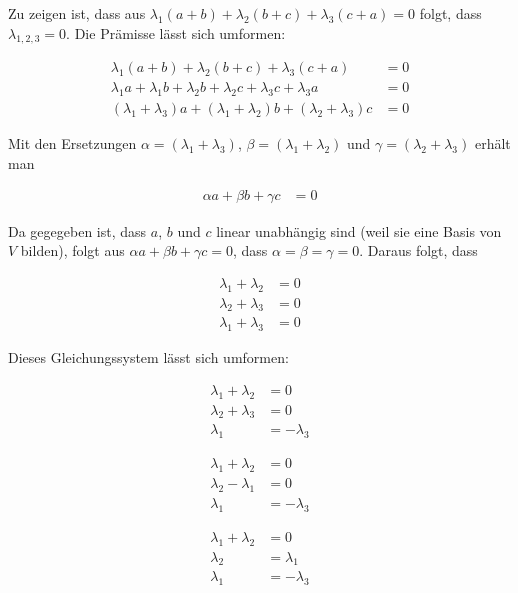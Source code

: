 \documentclass[a4paper,german,12pt,smallheadings]{scrartcl}
\begin{document}
Zu zeigen ist, dass aus $\lambda_1 (a+b) + \lambda_2 (b+c) + \lambda_3 (c+a) =
0$ folgt, dass $\lambda_{1,2,3} = 0$. Die Prämisse lässt sich umformen:

\begin{align*}
  \lambda_1 (a+b) + \lambda_2 (b+c) + \lambda_3 (c+a) &= 0 \\
  \lambda_1 a + \lambda_1 b + \lambda_2 b + \lambda_2 c + \lambda_3 c + \lambda_3 a &= 0 \\
  (\lambda_1 + \lambda_3) a + (\lambda_1 + \lambda_2) b + (\lambda_2 + \lambda_3) c &= 0
\end{align*}

Mit den Ersetzungen $\alpha = (\lambda_1 + \lambda_3)$, $\beta = (\lambda_1 +
\lambda_2)$ und $\gamma = (\lambda_2 + \lambda_3)$ erhält man

\begin{align*}
  \alpha a + \beta b + \gamma c &= 0
\end{align*}

Da gegegeben ist, dass $a$, $b$ und $c$ linear unabhängig sind (weil sie eine
Basis von $V$ bilden), folgt aus $\alpha a + \beta b + \gamma c = 0$, dass $\alpha =
\beta = \gamma = 0$. Daraus folgt, dass

\begin{align*}
  \lambda_1 + \lambda_2 &= 0 \\
  \lambda_2 + \lambda_3 &= 0 \\
  \lambda_1 + \lambda_3 &= 0
\end{align*}

Dieses Gleichungssystem lässt sich umformen:

\begin{align*}
  \lambda_1 + \lambda_2 &= 0 \\
  \lambda_2 + \lambda_3 &= 0 \\
  \lambda_1 &= -\lambda_3
\end{align*}

\begin{align*}
  \lambda_1 + \lambda_2 &= 0 \\
  \lambda_2 - \lambda_1 &= 0 \\
  \lambda_1 &= -\lambda_3
\end{align*}

\begin{align*}
  \lambda_1 + \lambda_2 &= 0 \\
  \lambda_2 &= \lambda_1 \\
  \lambda_1 &= -\lambda_3
\end{align*}
\end{document}

